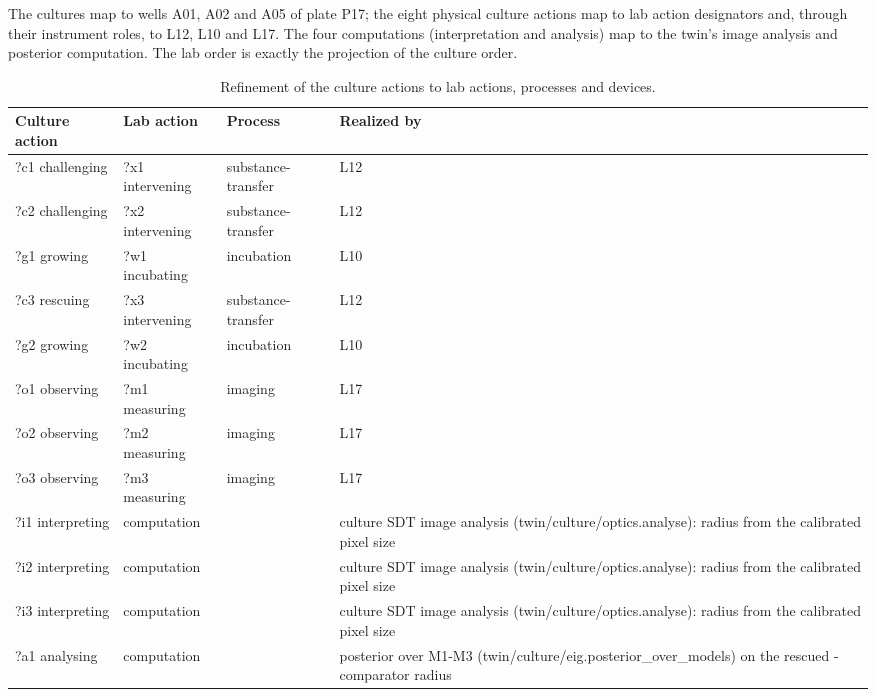 \documentclass[10pt,a4paper]{article}
\begin{document}
The cultures map to wells A01, A02 and A05 of plate P17; the eight physical culture actions map to lab action designators and, through their instrument roles, to L12, L10 and L17. The four computations (interpretation and analysis) map to the twin's image analysis and posterior computation. The lab order is exactly the projection of the culture order.

\begin{table}[tbp]\centering\small
\caption{Refinement of the culture actions to lab actions, processes and devices.}\label{tab:refine}
\begin{tabularx}{\linewidth}{lllX}\toprule
\textbf{Culture action} & \textbf{Lab action} & \textbf{Process} & \textbf{Realized by} \\\midrule
?c1 challenging & ?x1 intervening & substance-transfer & L12 \\
?c2 challenging & ?x2 intervening & substance-transfer & L12 \\
?g1 growing & ?w1 incubating & incubation & L10 \\
?c3 rescuing & ?x3 intervening & substance-transfer & L12 \\
?g2 growing & ?w2 incubating & incubation & L10 \\
?o1 observing & ?m1 measuring & imaging & L17 \\
?o2 observing & ?m2 measuring & imaging & L17 \\
?o3 observing & ?m3 measuring & imaging & L17 \\
?i1 interpreting &  computation &  & culture SDT image analysis (twin/culture/optics.analyse): radius from the calibrated pixel size \\
?i2 interpreting &  computation &  & culture SDT image analysis (twin/culture/optics.analyse): radius from the calibrated pixel size \\
?i3 interpreting &  computation &  & culture SDT image analysis (twin/culture/optics.analyse): radius from the calibrated pixel size \\
?a1 analysing &  computation &  & posterior over M1-M3 (twin/culture/eig.posterior\_\allowbreak{}over\_\allowbreak{}models) on the rescued - comparator radius \\\bottomrule
\end{tabularx}
\end{table}
\end{document}
